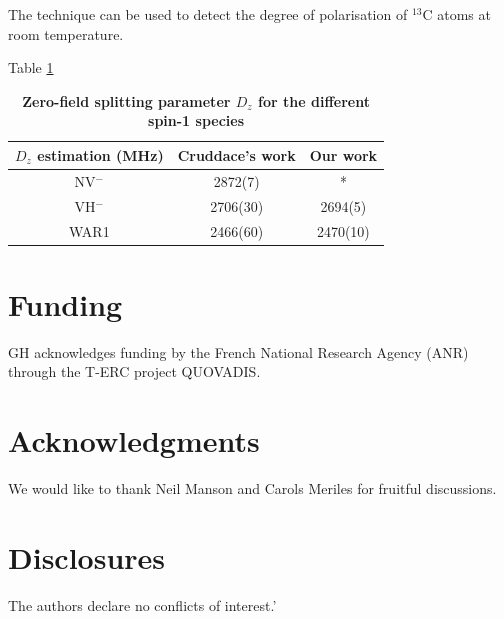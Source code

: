 \documentclass[9pt,twocolumn,twoside]{osajnl}
\begin{document}
The technique can be used to detect the degree of polarisation of $^{13}$C atoms at room temperature.


Table \ref{tab:shape-functions} 


\begin{table}[htbp]
\centering
\caption{\bf Zero-field splitting parameter $D_z$ for the different spin-1 species}
\begin{tabular}{ccc}
\hline
$D_z$ estimation (MHz) & Cruddace's work\citep{cruddace2007magnetic} & Our work \\
\hline
NV$^-$ & 2872(7) & * \\
VH$^-$ & 2706(30) & 2694(5)  \\
WAR1 & 2466(60) & 2470(10) \\
\hline
\end{tabular}
  \label{tab:shape-functions}
\end{table}



\section{Funding}
GH acknowledges funding by the French National Research Agency (ANR) through the T-ERC project QUOVADIS. 

\section{Acknowledgments}
We would like to thank Neil Manson and Carols Meriles for fruitful discussions. 





\section{Disclosures}

The authors declare no conflicts of interest.'



\end{document}
